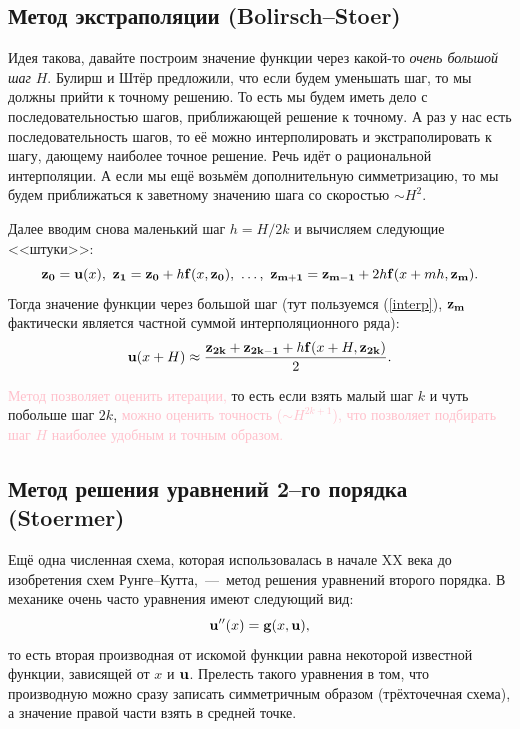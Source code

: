 \documentclass[a4,14pt,russian]{article}
\begin{document}
\subsection{Метод экстраполяции (Bolirsch--Stoer)}
    Идея такова, давайте построим значение функции через какой-то {\it очень большой шаг} $H$. Булирш и Штёр предложили, что если будем уменьшать шаг, то мы должны прийти к точному решению. То есть мы будем иметь дело с последовательностью шагов, приближающей решение к точному. А раз у нас есть последовательность шагов, то её можно интерполировать и экстраполировать к шагу, дающему наиболее точное решение. Речь идёт о рациональной интерполяции. А если мы ещё возьмём дополнительную симметризацию, то мы будем приближаться к заветному значению шага со скоростью $\sim H^2$.\par
    Далее вводим снова маленький шаг $h = {H}/{2k}$  и вычисляем следующие <<штуки>>:
    \begin{equation}
     {\bf z_0} = {\bf u}(x),\ {\bf z_1} = {\bf z_0}+h{\bf f}(x,{\bf z_0}),\ \dots ,\ {\bf z_{m+1}} = {\bf z_{m-1}}+2h{\bf f}(x + mh,{\bf z_m}).
    \end{equation}
    Тогда значение функции через большой шаг (тут пользуемся (\ref{interp}), ${\bf z_m}$ фактически является частной суммой интерполяционного ряда):
    \begin{equation}
     {\bf u}(x + H) \approx \frac{{\bf z_{2k}} + {\bf z_{2k-1}}+ h{\bf f}(x+H, {\bf z_{2k}})}{2} .
    \end{equation}\par
    \textcolor{pink}{Метод позволяет оценить итерации,} то есть если взять малый шаг $k$ и чуть побольше шаг $2k$, \textcolor{pink}{можно оценить точность ($\sim H^{2k+1}$), что} \textcolor{pink}{позволяет подбирать шаг $H$ наиболее удобным и точным образом.}
\subsection{Метод решения уравнений 2--го порядка (Stoermer)}
    Ещё одна численная схема, которая использовалась в начале XX века до изобретения схем Рунге--Кутта,~---~метод решения уравнений второго порядка. В механике очень часто уравнения имеют следующий вид:
    \begin{equation}
     {\bf u''}(x) = {\bf g}(x, {\bf u}),
    \end{equation}
    то есть вторая производная от искомой функции равна некоторой известной функции, зависящей от $x$ и ${\bf u}$. Прелесть такого уравнения в том, что производную можно сразу записать симметричным образом (трёхточечная схема), а значение правой части взять в средней точке.
    
\end{document}
